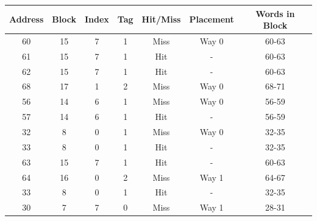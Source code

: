 \documentclass[12pt]{article}
\begin{document}
\begin{table}[ht]
    \centering
        \begin{tabular}{|c|c|c|c|c|c|c|}
        \hline
        \textbf{Address} & \textbf{Block} & \textbf{Index} & \textbf{Tag} & \textbf{Hit/Miss} & \textbf{Placement} & \textbf{Words in Block} \\ \hline
        60               & 15                     & 7              & 1            & Miss              & Way 0              & 60-63                   \\ \hline
        61               & 15                     & 7              & 1            & Hit               & -                  & 60-63                   \\ \hline
        62               & 15                     & 7              & 1            & Hit               & -                  & 60-63                   \\ \hline
        68               & 17                     & 1              & 2            & Miss              & Way 0              & 68-71                   \\ \hline
        56               & 14                     & 6              & 1            & Miss              & Way 0              & 56-59                   \\ \hline
        57               & 14                     & 6              & 1            & Hit               & -                  & 56-59                   \\ \hline
        32               & 8                      & 0              & 1            & Miss              & Way 0              & 32-35                   \\ \hline
        33               & 8                      & 0              & 1            & Hit               & -                  & 32-35                   \\ \hline
        63               & 15                     & 7              & 1            & Hit               & -                  & 60-63                   \\ \hline
        64               & 16                     & 0              & 2            & Miss              & Way 1              & 64-67                   \\ \hline
        33               & 8                      & 0              & 1            & Hit               & -                  & 32-35                   \\ \hline
        30               & 7                      & 7              & 0            & Miss              & Way 1              & 28-31                   \\ \hline
        \end{tabular}
\end{table}
\end{document}
